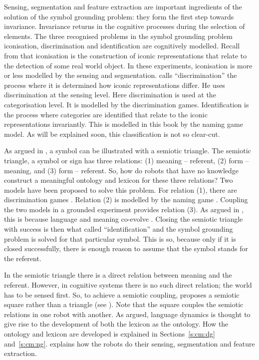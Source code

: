 Sensing, segmentation and feature extraction are important ingredients of the solution of the symbol grounding problem: they form the first step towards invariance. Invariance returns in the cognitive processes during the selection of elements. The three recognised problems in the symbol grounding problem iconisation, discrimination and identification \citep{harnad:1990} are cognitively modelled. Recall from  that iconisation is the construction of iconic representations that relate to the detection of some real world object. In these experiments, iconisation is more or less modelled by the sensing and segmentation. \citet{harnad:1990} calls ``discrimination'' the process where it is determined how iconic representations differ. He uses discrimination at the sensing level. Here discrimination is used at the categorisation level. It is modelled by the discrimination games. Identification is the process where categories are identified that relate to the iconic representations invariantly. This is modelled in this book by the naming game model. As will be explained soon, this classification is not so clear-cut.

As argued in , a symbol can be illustrated with a semiotic triangle. The semiotic triangle, a symbol or sign has three relations: (1) meaning -- referent, (2) form -- meaning, and (3) form -- referent. So, how do robots that have no knowledge construct a meaningful ontology and lexicon for these three relations? Two models have been proposed to solve this problem. For relation (1), there are discrimination games \citep{steels:1996b}. Relation (2) is modelled by the naming game \citep{steels:1996a}. Coupling the two models in a grounded experiment provides relation (3). As argued in , this is because language and meaning co-evolve \citep{steels:1997a}. Closing the semiotic triangle with success is then what \citet{harnad:1990} called ``identification'' and the symbol grounding problem is solved for that particular symbol. This is so, because only if it is closed successfully, there is enough reason to assume that the symbol stands for the referent.

In the semiotic triangle there is a direct relation between meaning and the referent. However, in cognitive systems there is no such direct relation; the world has to be sensed first. So, to achieve a semiotic coupling, \citet{steels:2000} proposes a semiotic square rather than a triangle (see ). Note that the square couples the semiotic relations in one robot with another. As argued, language dynamics is thought to give rise to the development of both the lexicon as the ontology. How the ontology and lexicon are developed is explained in Sections~\ref{s:cm:dg} and~\ref{s:cm:ng}.  explains how the robots do their sensing, segmentation and feature extraction.


